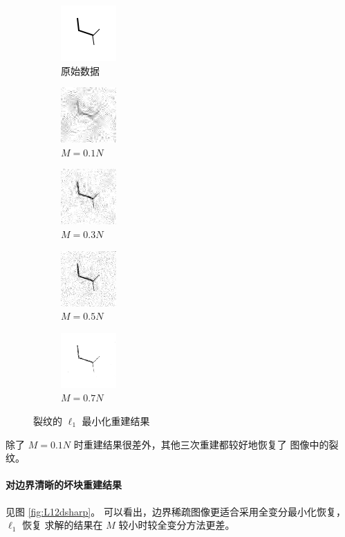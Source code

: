 \begin{figure}
\centering
\begin{subfigure}[t]{1.1in}
	\includegraphics{Figure/testdata/1d.png}
	\caption{原始数据}
\end{subfigure}
\begin{subfigure}[t]{1.1in}
	\includegraphics{Figure/L1/1d10.png}
	\caption{$M = 0.1 N$}
\end{subfigure}
\begin{subfigure}[t]{1.1in}
	\includegraphics{Figure/L1/1d30.png}
	\caption{$M = 0.3 N$}
\end{subfigure}
\begin{subfigure}[t]{1.1in}
	\includegraphics{Figure/L1/1d50.png}
	\caption{$M = 0.5 N$}
\end{subfigure}
\begin{subfigure}[t]{1.1in}
	\includegraphics{Figure/TV/1d70.png}
	\caption{$M = 0.7 N$}
\end{subfigure}
\caption{裂纹的 $\ell_1$ 最小化重建结果}
\label{fig:L11d}
\end{figure}

除了 $M = 0.1N$ 时重建结果很差外，其他三次重建都较好地恢复了
图像中的裂纹。

\paragraph{对边界清晰的坏块重建结果} 见图 \ref{fig:L12dsharp}。
可以看出，边界稀疏图像更适合采用全变分最小化恢复， $\ell_1$ 恢复
求解的结果在 $M$ 较小时较全变分方法更差。


